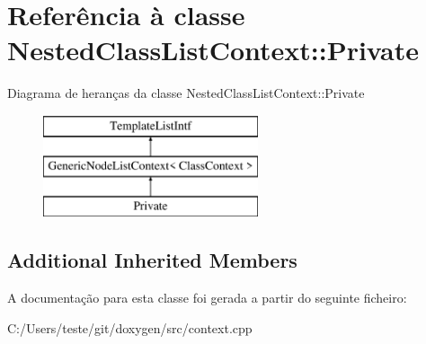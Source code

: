\hypertarget{class_nested_class_list_context_1_1_private}{\section{Referência à classe Nested\-Class\-List\-Context\-:\-:Private}
\label{class_nested_class_list_context_1_1_private}
}
Diagrama de heranças da classe Nested\-Class\-List\-Context\-:\-:Private\begin{figure}[H]
\begin{center}
\leavevmode
\includegraphics[height=3.000000cm]{class_nested_class_list_context_1_1_private}
\end{center}
\end{figure}
\subsection*{Additional Inherited Members}


A documentação para esta classe foi gerada a partir do seguinte ficheiro\-:\begin{DoxyCompactItemize}
\item 
C\-:/\-Users/teste/git/doxygen/src/context.\-cpp\end{DoxyCompactItemize}
